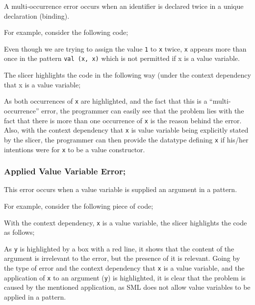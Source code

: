 \documentclass{report}
\begin{document}
\begin{itemize}
\subitem A multi-occurrence error occurs when an identifier is
declared twice in a unique declaration (binding).

For example, consider the following code;


Even though we are trying to assign the value \texttt{1} to
\texttt{x} twice, \texttt{x} appears more than once in
the pattern \texttt{val (x, x)} which is not permitted if x is
a value variable.

The slicer highlights the code in the following way (under the
context dependency that x is a value variable;


As both occurrences of \texttt{x} are highlighted, and the fact
that this is a ``multi-occurrence'' error, the programmer can easily
see that the problem lies with the fact that there is more than one
occurrence of \texttt{x} is the reason behind the error. Also,
with the context dependency that \texttt{x} is value variable being
explicitly stated by the slicer, the programmer can then provide the
datatype defining \texttt{x} if his/her intentions were for
\texttt{x} to be a value constructor.

\newpage


\subsubsection{Applied Value Variable Error;}

\subitem This error occurs when a value variable is supplied an
argument in a pattern.

For example, consider the following piece of code;


With the context dependency, \texttt{x} is a value variable,
 the slicer highlights the code as follows;


As \texttt{y} is highlighted by a box with a red line, it shows
that the content of the argument is irrelevant to the error, but the
presence of it is relevant. Going by the type of error and the context
dependency that \texttt{x} is a value variable, and the
application of \texttt{x} to an argument (\texttt{y}) is
highlighted, it is clear that the problem is caused by the mentioned
application, as SML does not allow value variables to be applied in a
pattern.


\end{itemize}
\end{document}
